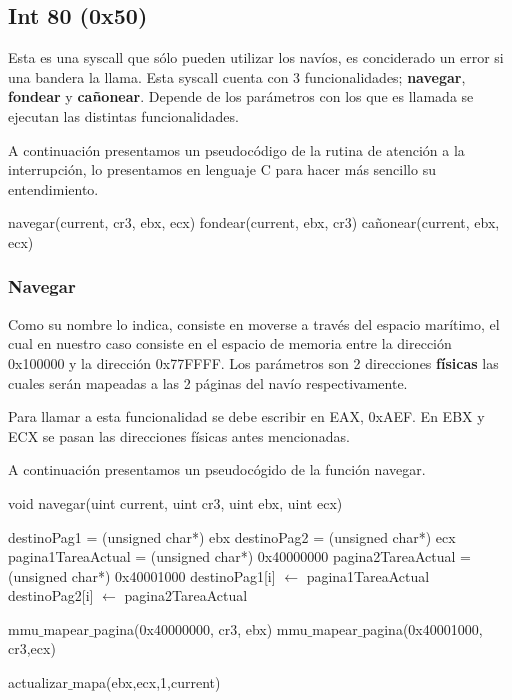 \subsection{Int 80 (0x50)}
\par{Esta es una syscall que sólo pueden utilizar los navíos, es conciderado un error si una bandera la llama. Esta syscall cuenta con 3 funcionalidades; \textbf{navegar}, \textbf{fondear} y \textbf{cañonear}. Depende de los parámetros con los que es llamada se ejecutan las distintas funcionalidades.}
\par{A continuación presentamos un pseudocódigo de la rutina de atención a la interrupción, lo presentamos en lenguaje C para hacer más sencillo su entendimiento.}

\begin{algorithmic}
	\State navegar(current, cr3, ebx, ecx)
	\EndIf
		\State fondear(current, ebx, cr3)
	\EndIf
	\State cañonear(current, ebx, ecx)
	\EndIf
\end{algorithmic}

\subsubsection{Navegar}
\par{Como su nombre lo indica, consiste en moverse a través del espacio marítimo, el cual en nuestro caso consiste en el espacio de memoria entre la dirección 0x100000 y la dirección 0x77FFFF. Los parámetros son 2 direcciones \textbf{físicas} las cuales serán mapeadas a las 2 páginas del navío respectivamente.}
\par{Para llamar a esta funcionalidad se debe escribir en EAX, 0xAEF. En EBX y ECX se pasan las direcciones físicas antes mencionadas.}
\par{A continuación presentamos un pseudocógido de la función navegar.}

\begin{algorithm}[h!]
\caption{void navegar(uint current, uint cr3, uint ebx, uint ecx)}
\begin{algorithmic}
	\State destinoPag1 = (unsigned char*) ebx
	\State destinoPag2 = (unsigned char*) ecx
	\State pagina1TareaActual = (unsigned char*) 0x40000000
	\State pagina2TareaActual = (unsigned char*) 0x40001000
		\State destinoPag1[i] $\gets$ pagina1TareaActual
		\State destinoPag2[i] $\gets$ pagina2TareaActual
	\EndFor

	\State mmu$\_$mapear$\_$pagina(0x40000000, cr3, ebx)
	\State mmu$\_$mapear$\_$pagina(0x40001000, cr3,ecx)
	
	\State actualizar$\_$mapa(ebx,ecx,1,current)
	
\end{algorithmic}
\end{algorithm}

